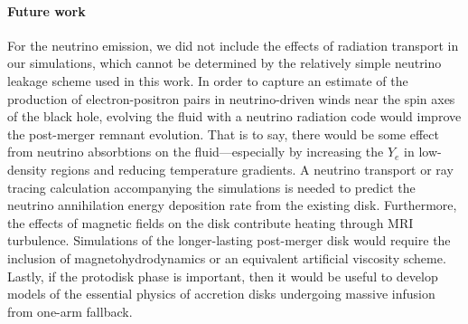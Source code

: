 \paragraph{Future work} 

For the neutrino emission, we did not include the effects of radiation transport in our simulations, which cannot be determined by the relatively simple neutrino leakage scheme used in this work.
In order to capture an estimate of the production of electron-positron pairs in neutrino-driven winds near the spin axes of the black hole, evolving the fluid with a neutrino radiation code would improve the post-merger remnant evolution.
That is to say, there would be some effect from neutrino absorbtions on the fluid---especially by increasing the $Y_e$ in low-density regions and reducing temperature gradients.
A neutrino transport or ray tracing calculation accompanying the simulations is needed to predict the neutrino annihilation energy deposition rate from the existing disk.
Furthermore, the effects of magnetic fields on the disk contribute heating through MRI turbulence.
Simulations of the longer-lasting post-merger disk would require the inclusion of magnetohydrodynamics or an equivalent artificial viscosity scheme. 
Lastly, if the protodisk phase is important, then it would be useful to develop models of the essential physics of accretion disks undergoing massive infusion from one-arm fallback.

